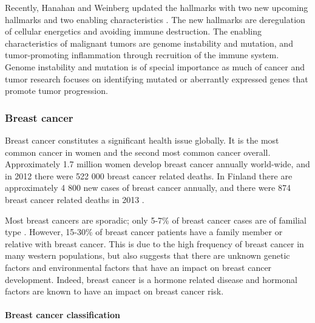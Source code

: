 Recently, Hanahan and Weinberg updated the hallmarks with two new upcoming
hallmarks and two enabling characteristics \citep{Hanahan2011}. The new
hallmarks are deregulation of cellular energetics and avoiding immune
destruction. The enabling characteristics of malignant tumors are genome
instability and mutation, and tumor-promoting inflammation through recruition
of the immune system. Genome instability and mutation is of special importance
as much of cancer and tumor research focuses  on identifying mutated or
aberrantly expressed genes that promote tumor progression.



\subsubsection{Breast cancer}\label{breast-cancer}

Breast cancer constitutes a significant health issue globally. It is the most
common cancer in women and the second most common cancer overall.
Approximately 1.7 million women develop breast cancer annually world-wide, and
in 2012 there were 522 000 breast cancer related deaths.
\citep{Ferlay2015} In Finland there are approximately 4 800 new cases of
breast cancer annually, and there were 874 breast cancer related deaths in
2013 \citep{Syoparekisteri}.

Most breast cancers are sporadic; only 5-7\% of breast cancer cases are of
familial type \citep{Melchor2013}. However, 15-30\% of breast cancer patients
have a family member or relative with breast cancer. This is due to the high
frequency of breast cancer in many western populations, but also suggests that
there are unknown genetic factors and environmental factors that have an
impact on breast cancer development.  Indeed, breast cancer is a hormone
related disease and hormonal factors are known to have an impact on
breast cancer risk.


\paragraph{Breast cancer classification}\label{breast-cancer-classification}

